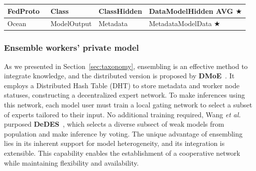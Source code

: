 \begin{table}[t]
\begin{tabular}{|l|p{2.6cm}|p{4cm}|p{5cm}|}
    FedProto~\cite{tan2022fedproto, michieli2021prototype} & \colorbox{Employer!30}{Class} & \colorbox{Employer!30}{Class}\colorbox{Worker!30}{Hidden} & \colorbox{Worker!30}{Data}\colorbox{Worker!30}{Model}\colorbox{Platform!30}{Hidden AVG} $\bigstar$ \\ \hline   

    Ocean~\cite{mcconaghy2022ocean} & \colorbox{Employer!30}{Model}\colorbox{Worker!30}{Output} & \colorbox{Worker!30}{Metadata} & \colorbox{Worker!30}{Metadata}\colorbox{Employer!30}{Model}\colorbox{Worker!30}{Data} $\bigstar$ \\ \hline

    \end{tabular}
\end{table}

\subsubsection{Ensemble workers' private model} %
As we presented in Section~\ref{sec:taxonomy}, ensembling is an effective method to integrate knowledge, and the distributed version is proposed by \textbf{DMoE}~\cite{ryabinin2020towards}. 
It employs a Distributed Hash Table (DHT) to store metadata and worker node statuses, constructing a decentralized expert network. 
To make inferences using this network, each model user must train a local gating network to select a subset of experts tailored to their input.
No additional training required, Wang \textit{et al.} purposed \textbf{DeDES}~\cite{wang2023data}, which selects a diverse subsect of weak models from population and make inference by voting. 
The unique advantage of ensembling lies in its inherent support for model heterogeneity, and its integration is extensible. 
This capability enables the establishment of a cooperative network while maintaining flexibility and availability.

